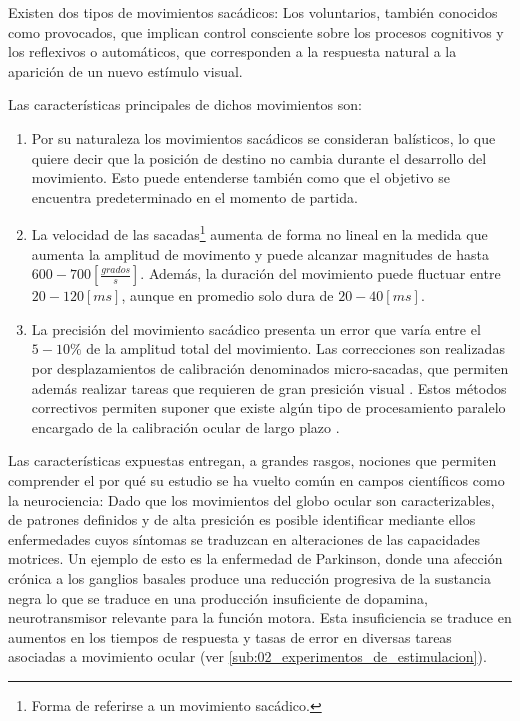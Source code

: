 \documentclass[../main.tex]{subfiles}
\begin{document}
		Existen dos tipos de movimientos sacádicos: Los voluntarios, también conocidos como provocados, que implican control consciente sobre los procesos cognitivos y los reflexivos o automáticos, que corresponden a la respuesta natural a la aparición de un nuevo estímulo visual.

		Las características principales de dichos movimientos son:
		\begin{enumerate}\setlength\itemsep{-0.2em}
			\item Por su naturaleza los movimientos sacádicos se consideran balísticos, lo que quiere decir que la posición de destino no cambia durante el desarrollo del movimiento. Esto puede entenderse también como que el objetivo se encuentra predeterminado en el momento de partida.

			\item La velocidad de las sacadas\footnote{Forma de referirse a un movimiento sacádico.} aumenta de forma no lineal en la medida que aumenta la amplitud de movimento y puede alcanzar magnitudes de hasta $600 - 700[\frac{grados}{s}]$. Además, la duración del movimiento puede fluctuar entre $20 - 120[ms]$, aunque en promedio solo dura de $20-40[ms]$. 

			\item La precisión del movimiento sacádico presenta un error que varía entre el $5-10\%$ de la amplitud total del movimiento. Las correcciones son realizadas por desplazamientos de calibración denominados micro-sacadas, que permiten además realizar tareas que requieren de gran presición visual \cite{article:movOcular4}. Estos métodos correctivos permiten suponer que existe algún tipo de procesamiento paralelo encargado de la calibración ocular de largo plazo \cite{article:movOcular2}.  

		\end{enumerate}

		Las características expuestas entregan, a grandes rasgos, nociones que permiten comprender el por qué su estudio se ha vuelto común en campos científicos como la neurociencia: Dado que los movimientos del globo ocular son caracterizables, de patrones definidos y de alta presición es posible identificar mediante ellos enfermedades cuyos síntomas se traduzcan en alteraciones de las capacidades motrices. Un ejemplo de esto es la enfermedad de Parkinson, donde una afección crónica a los ganglios basales produce una reducción progresiva de la sustancia negra lo que se traduce en una producción insuficiente de dopamina, neurotransmisor relevante para la función motora. Esta insuficiencia se traduce en aumentos en los tiempos de respuesta y tasas de error en diversas tareas asociadas a movimiento ocular \cite{article:tests_1, article:tests_2, article:tests_3, article:tests_4} (ver \ref{sub:02_experimentos_de_estimulacion}).    
\end{document}
